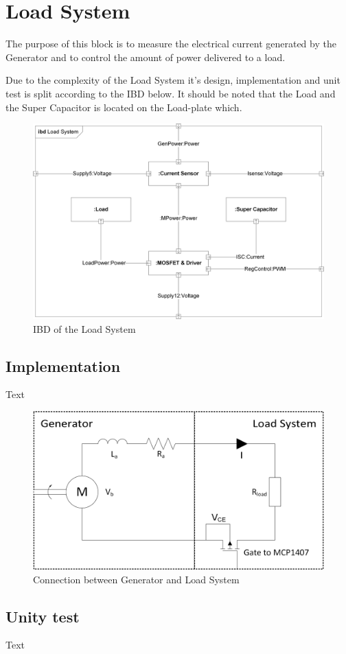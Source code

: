 \newpage
\section{Load System}
The purpose of this block is to measure the electrical current generated by the Generator and to control the amount of power delivered to a load.

Due to the complexity of the Load System it's design, implementation and unit test is split according to the IBD below. It should be noted that the Load and the Super Capacitor is located on the Load-plate which.

\begin{figure}[H]
	\centering
	\includegraphics[width=1\linewidth]{Hardware/Pictures/IBD_LoadSystem}
	\caption{IBD of the Load System}
	\label{fig:IBD_Load_System}
\end{figure}







\subsection{Implementation}
Text

\begin{figure}[H]
	\centering
	\includegraphics[width=0.7\linewidth]{Hardware/Pictures/LoadSystem}
	\caption{Connection between Generator and Load System}
	\label{fig:Load_System}
\end{figure}

\subsection{Unity test}
Text